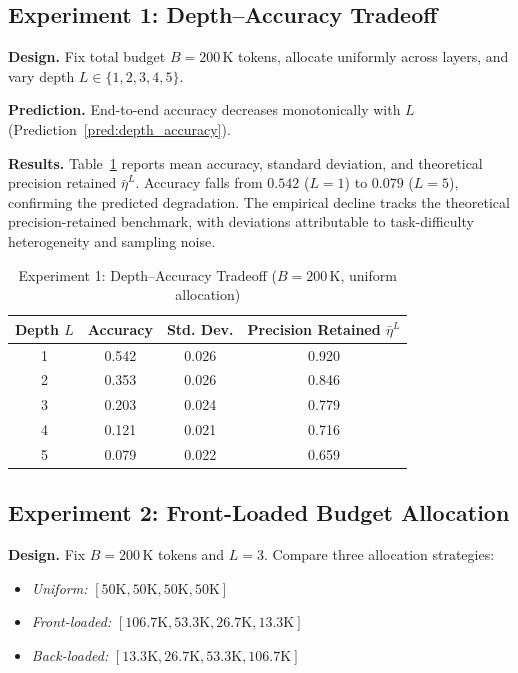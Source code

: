 \subsection{Experiment 1: Depth--Accuracy Tradeoff}

\textbf{Design.} Fix total budget $B = 200\,$K tokens, allocate uniformly across layers, and vary depth $L \in \{1, 2, 3, 4, 5\}$.

\textbf{Prediction.} End-to-end accuracy decreases monotonically with $L$ (Prediction~\ref{pred:depth_accuracy}).

\textbf{Results.} Table~\ref{tab:exp1} reports mean accuracy, standard deviation, and theoretical precision retained $\bar{\eta}^{L}$. Accuracy falls from $0.542$ ($L = 1$) to $0.079$ ($L = 5$), confirming the predicted degradation. The empirical decline tracks the theoretical precision-retained benchmark, with deviations attributable to task-difficulty heterogeneity and sampling noise.

\begin{table}[htbp]
\centering
\caption{Experiment 1: Depth--Accuracy Tradeoff ($B = 200\,$K, uniform allocation)}
\label{tab:exp1}
\begin{tabular}{@{}cccc@{}}
\toprule
Depth $L$ & Accuracy & Std. Dev. & Precision Retained $\bar{\eta}^{L}$ \\
\midrule
1 & 0.542 & 0.026 & 0.920 \\
2 & 0.353 & 0.026 & 0.846 \\
3 & 0.203 & 0.024 & 0.779 \\
4 & 0.121 & 0.021 & 0.716 \\
5 & 0.079 & 0.022 & 0.659 \\
\bottomrule
\end{tabular}
\end{table}

\subsection{Experiment 2: Front-Loaded Budget Allocation}

\textbf{Design.} Fix $B = 200\,$K tokens and $L = 3$. Compare three allocation strategies:
\begin{itemize}
\item \textit{Uniform:} $[50\text{K}, 50\text{K}, 50\text{K}, 50\text{K}]$
\item \textit{Front-loaded:} $[106.7\text{K}, 53.3\text{K}, 26.7\text{K}, 13.3\text{K}]$
\item \textit{Back-loaded:} $[13.3\text{K}, 26.7\text{K}, 53.3\text{K}, 106.7\text{K}]$
\end{itemize}


